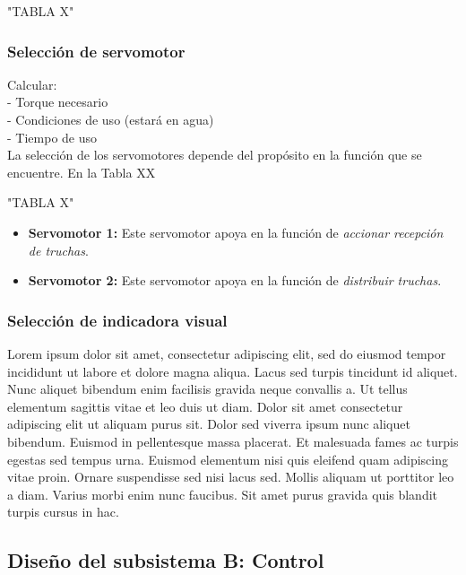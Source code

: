 "TABLA X"


\subsubsection{Selección de servomotor} %

Calcular: \\
- Torque necesario \\
- Condiciones de uso (estará en agua) \\
- Tiempo de uso \\

La selección de los servomotores depende del propósito en la función que se encuentre. En la Tabla XX 

"TABLA X"

\begin{itemize}
	
	\item \textbf{Servomotor 1: } Este servomotor apoya en la función de \textit{accionar recepción de truchas}.

	\item \textbf{Servomotor 2: } Este servomotor apoya en la función de \textit{distribuir truchas}.
	
\end{itemize}


\subsubsection{Selección de indicadora visual} %

Lorem ipsum dolor sit amet, consectetur adipiscing elit, sed do eiusmod tempor incididunt ut labore et dolore magna aliqua. Lacus sed turpis tincidunt id aliquet. Nunc aliquet bibendum enim facilisis gravida neque convallis a. Ut tellus elementum sagittis vitae et leo duis ut diam. Dolor sit amet consectetur adipiscing elit ut aliquam purus sit. Dolor sed viverra ipsum nunc aliquet bibendum. Euismod in pellentesque massa placerat. Et malesuada fames ac turpis egestas sed tempus urna. Euismod elementum nisi quis eleifend quam adipiscing vitae proin. Ornare suspendisse sed nisi lacus sed. Mollis aliquam ut porttitor leo a diam. Varius morbi enim nunc faucibus. Sit amet purus gravida quis blandit turpis cursus in hac.

\subsection{Diseño del subsistema B: Control}

